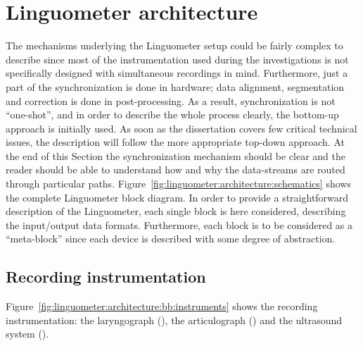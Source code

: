 \section{Linguometer architecture}
\label{ch:linguometer:architecture}
The mechanisms underlying the Linguometer setup could be fairly complex to
describe since most of the instrumentation used during the investigations is
not specifically designed with simultaneous recordings in mind.
Furthermore, just a part of the synchronization is done in hardware; 
data alignment, segmentation and correction is done in post-processing.
As a result, synchronization is not ``one-shot'', and in order to describe the
whole process clearly, the bottom-up approach is initially used.
As soon as the dissertation covers few critical technical issues, the
description will follow the more appropriate top-down approach.
At the end of this Section the synchronization mechanism should be clear and 
the reader should be able to understand how and why the data-streams are routed
through particular paths. 
\label{sec:linguometer:architecture:blocks}
Figure~\ref{fig:linguometer:architecture:schematics} shows the complete
Linguometer block diagram.
In order to provide a straightforward description of the Linguometer, each
single block is here considered, describing the input/output data formats.
Furthermore, each block is to be considered as a ``meta-block'' since each
device is described with some degree of abstraction.
\subsection{Recording instrumentation}

Figure~\ref{fig:linguometer:architecture:bb:instruments} shows the recording
instrumentation: the laryngograph (), the articulograph () and
the ultrasound system ().


